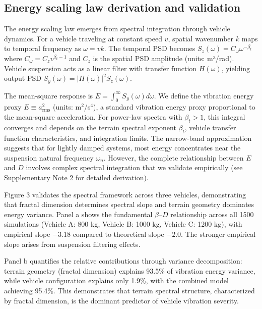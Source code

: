 \documentclass[11pt]{article}
\begin{document}
\subsection*{Energy scaling law derivation and validation}

The energy scaling law emerges from spectral integration through vehicle dynamics. For a vehicle traveling at constant speed $v$, spatial wavenumber $k$ maps to temporal frequency as $\omega = vk$\cite{Robson1979,Wong2022}. The temporal PSD becomes $S_z(\omega) = C_\omega \omega^{-\beta_t}$ where $C_\omega = C_z v^{\beta_t-1}$ and $C_z$ is the spatial PSD amplitude (units: m³/rad)\cite{Bendat2010}. Vehicle suspension acts as a linear filter with transfer function $H(\omega)$, yielding output PSD $S_y(\omega) = |H(\omega)|^2 S_z(\omega)$\cite{CrandallMark1963,Newland2005}.

The mean-square response is $E = \int_0^\infty S_y(\omega) d\omega$. We define the vibration energy proxy $E \equiv a_{\mathrm{rms}}^2$ (units: m$^2$/s$^4$), a standard vibration energy proxy proportional to the mean-square acceleration. For power-law spectra with $\beta_t > 1$, this integral converges and depends on the terrain spectral exponent $\beta_t$, vehicle transfer function characteristics, and integration limits. The narrow-band approximation\cite{Miles1954,Crandall1962} suggests that for lightly damped systems, most energy concentrates near the suspension natural frequency $\omega_n$. However, the complete relationship between $E$ and $D$ involves complex spectral integration that we validate empirically (see Supplementary Note 2 for detailed derivation).

Figure 3 validates the spectral framework across three vehicles, demonstrating that fractal dimension determines spectral slope and terrain geometry dominates energy variance. Panel a shows the fundamental $\beta$--$D$ relationship across all 1500 simulations (Vehicle A: 800 kg, Vehicle B: 1000 kg, Vehicle C: 1200 kg), with empirical slope $-3.18$ compared to theoretical slope $-2.0$. The stronger empirical slope arises from suspension filtering effects. 

Panel b quantifies the relative contributions through variance decomposition: terrain geometry (fractal dimension) explains 93.5\% of vibration energy variance, while vehicle configuration explains only 1.9\%, with the combined model achieving 95.4\%. This demonstrates that terrain spectral structure, characterized by fractal dimension, is the dominant predictor of vehicle vibration severity. 
\end{document}
